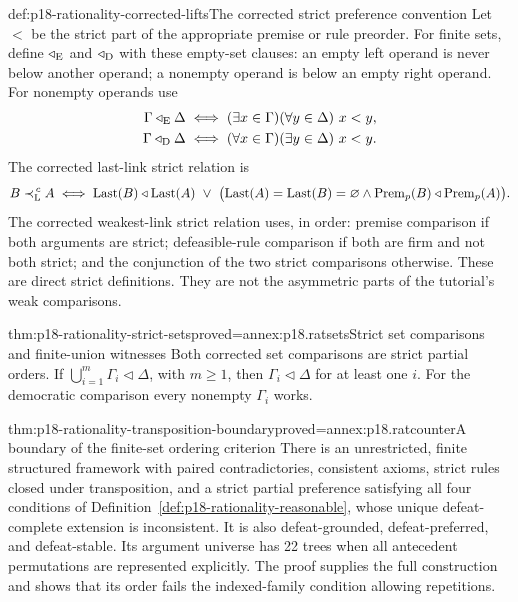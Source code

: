 \begin{hbdefinition}{def:p18-rationality-corrected-lifts}{The corrected strict preference convention}
Let \(<\) be the strict part of the appropriate premise or rule preorder.
For finite sets, define \(\triangleleft_{\rm E}\) and
\(\triangleleft_{\rm D}\) with these empty-set clauses: an empty left
operand is never below another operand; a nonempty operand is below
an empty right operand. For nonempty operands use
\[
\begin{aligned}
 \Gamma\triangleleft_{\rm E}\Delta
   &\iff(\exists x\in\Gamma)(\forall y\in\Delta)\ x<y,\\
 \Gamma\triangleleft_{\rm D}\Delta
   &\iff(\forall x\in\Gamma)(\exists y\in\Delta)\ x<y.
\end{aligned}
\]
The corrected last-link strict relation is
\[
 B\prec_{\rm L}^{\,c}A\iff
 \operatorname{Last}(B)\triangleleft\operatorname{Last}(A)
 \ \lor\
 \bigl(\operatorname{Last}(A)=\operatorname{Last}(B)=\varnothing
 \land\operatorname{Prem}_p(B)\triangleleft\operatorname{Prem}_p(A)\bigr).
\]
The corrected weakest-link strict relation uses, in order: premise
comparison if both arguments are strict; defeasible-rule comparison if
both are firm and not both strict; and the conjunction of the two strict
comparisons otherwise. These are direct strict definitions. They are
not the asymmetric parts of the tutorial's weak comparisons.
\end{hbdefinition}

\begin{hbtheorem}{thm:p18-rationality-strict-sets}{proved=annex:p18.ratsets}{Strict set comparisons and finite-union witnesses}
Both corrected set comparisons are strict partial orders.
If \(\bigcup_{i=1}^m\Gamma_i\triangleleft\Delta\), with \(m\geq1\),
then \(\Gamma_i\triangleleft\Delta\) for at least one \(i\).
For the democratic comparison every nonempty \(\Gamma_i\) works.
\end{hbtheorem}

\begin{hbtheorem}{thm:p18-rationality-transposition-boundary}{proved=annex:p18.ratcounter}{A boundary of the finite-set ordering criterion}
There is an unrestricted, finite structured framework with paired
contradictories, consistent axioms, strict rules closed under
transposition, and a strict partial preference satisfying all four
conditions of Definition~\ref{def:p18-rationality-reasonable}, whose
unique defeat-complete extension is inconsistent.
It is also defeat-grounded, defeat-preferred, and defeat-stable.
Its argument universe has 22 trees when all antecedent permutations
are represented explicitly. The proof supplies the full construction
and shows that its order fails the indexed-family condition allowing
repetitions.
\end{hbtheorem}

